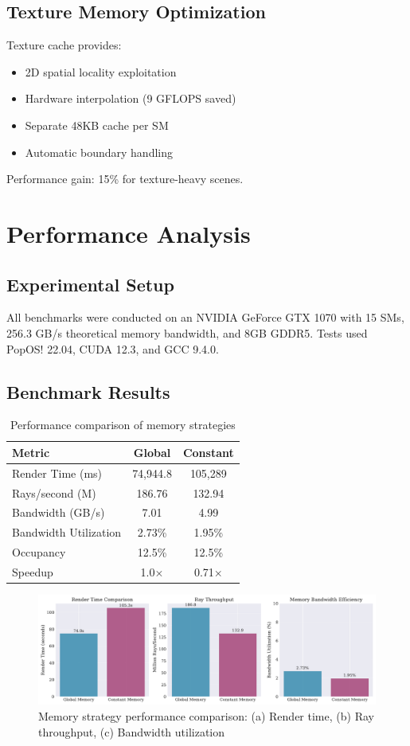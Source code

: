\documentclass[conference]{IEEEtran}
\begin{document}
\subsection{Texture Memory Optimization}
Texture cache provides:
\begin{itemize}
    \item 2D spatial locality exploitation
    \item Hardware interpolation (9 GFLOPS saved)
    \item Separate 48KB cache per SM
    \item Automatic boundary handling
\end{itemize}
Performance gain: 15\% for texture-heavy scenes.

\section{Performance Analysis}

\subsection{Experimental Setup}
All benchmarks were conducted on an NVIDIA GeForce GTX 1070 with 15 SMs, 256.3 GB/s theoretical memory bandwidth, and 8GB GDDR5. Tests used PopOS! 22.04, CUDA 12.3, and GCC 9.4.0.

\subsection{Benchmark Results}

\begin{table}[ht]
\centering
\caption{Performance comparison of memory strategies}
\begin{tabular}{lcc}
\toprule
Metric & Global & Constant \\
\midrule
Render Time (ms) & 74,944.8 & 105,289 \\
Rays/second (M) & 186.76 & 132.94 \\
Bandwidth (GB/s) & 7.01 & 4.99 \\
Bandwidth Utilization & 2.73\% & 1.95\% \\
Occupancy & 12.5\% & 12.5\% \\
Speedup & 1.0$\times$ & 0.71$\times$ \\
\bottomrule
\end{tabular}
\end{table}

\begin{figure}[ht]
\centering
\includegraphics[width=\columnwidth]{figures/memory_comparison.pdf}
\caption{Memory strategy performance comparison: (a) Render time, (b) Ray throughput, (c) Bandwidth utilization}
\label{fig:memory_comparison}
\end{figure}
\end{document}
